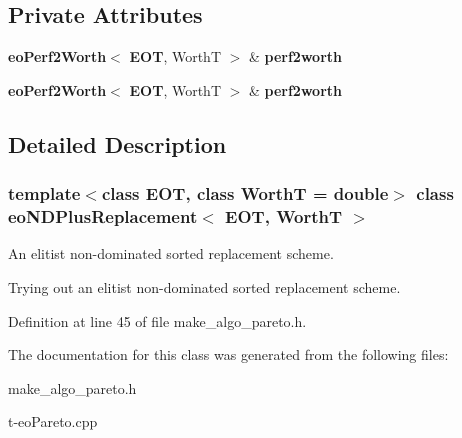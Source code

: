 \subsection*{Private Attributes}
\begin{CompactItemize}
\item 
{\bf eo\-Perf2Worth}$<$ {\bf EOT}, Worth\-T $>$ \& {\bf perf2worth}\label{classeo_n_d_plus_replacement_r0}

\item 
{\bf eo\-Perf2Worth}$<$ {\bf EOT}, Worth\-T $>$ \& {\bf perf2worth}\label{classeo_n_d_plus_replacement_r1}

\end{CompactItemize}


\subsection{Detailed Description}
\subsubsection*{template$<$class EOT, class Worth\-T = double$>$ class eo\-NDPlus\-Replacement$<$ EOT, Worth\-T $>$}

An elitist non-dominated sorted replacement scheme. 

Trying out an elitist non-dominated sorted replacement scheme. 



Definition at line 45 of file make\_\-algo\_\-pareto.h.

The documentation for this class was generated from the following files:\begin{CompactItemize}
\item 
make\_\-algo\_\-pareto.h\item 
t-eo\-Pareto.cpp\end{CompactItemize}
